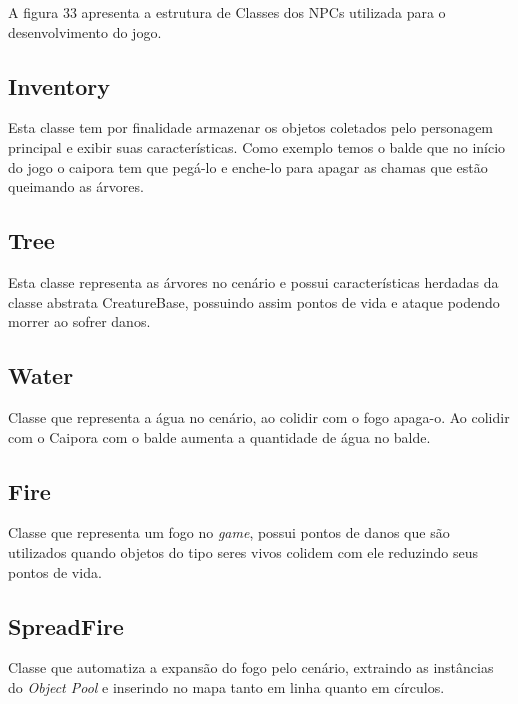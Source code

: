 A figura 33 apresenta a estrutura de Classes dos NPCs utilizada para o desenvolvimento do jogo.


	\begin{figure}[h!]
		\centering
	\end{figure}

\subsection{Inventory}
Esta classe tem por finalidade armazenar os objetos coletados pelo personagem principal e exibir suas características. Como exemplo temos o balde que no início do jogo o caipora tem que pegá-lo e enche-lo para apagar as chamas que estão queimando as árvores.


\subsection{Tree}
Esta classe representa as árvores no cenário e possui características herdadas da classe abstrata CreatureBase, possuindo assim pontos de vida e ataque podendo  morrer ao sofrer danos.


\subsection{Water}
Classe que representa a água no cenário, ao colidir com o fogo apaga-o. Ao colidir com o Caipora com o balde aumenta a quantidade de água no balde.


\subsection{Fire}
Classe que representa um fogo no \textit{game}, possui pontos de danos que são utilizados quando objetos do tipo seres vivos colidem com ele reduzindo seus pontos de vida.


\subsection{SpreadFire}
Classe que automatiza a expansão do fogo pelo cenário, extraindo as instâncias do \textit{Object Pool} e inserindo no mapa tanto em linha quanto em círculos.